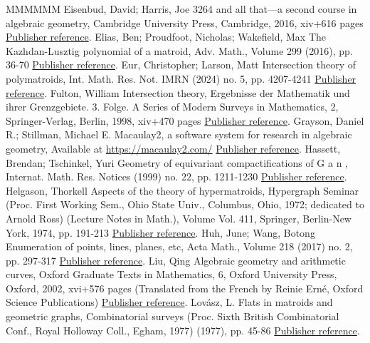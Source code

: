\documentclass[11pt]{article}
\theoremstyle{definition}
\numberwithin{equation}{section}
\begin{document}
\begin{thebibliography}{MMMMMM}
 Eisenbud, David; Harris, Joe 3264 and all that—a second course in algebraic geometry, Cambridge University Press, Cambridge, 2016, xiv+616 pages \href{https://alco.centre-mersenne.org/articles/10.5802/alco.447/#EH16}{Publisher reference}.
 Elias, Ben; Proudfoot, Nicholas; Wakefield, Max The Kazhdan-Lusztig polynomial of a matroid, Adv. Math., Volume 299 (2016), pp. 36-70 \href{https://alco.centre-mersenne.org/articles/10.5802/alco.447/#KLpoly}{Publisher reference}.
 Eur, Christopher; Larson, Matt Intersection theory of polymatroids, Int. Math. Res. Not. IMRN (2024) no. 5, pp. 4207-4241 \href{https://alco.centre-mersenne.org/articles/10.5802/alco.447/#EL23}{Publisher reference}.
 Fulton, William Intersection theory, Ergebnisse der Mathematik und ihrer Grenzgebiete. 3. Folge. A Series of Modern Surveys in Mathematics, 2, Springer-Verlag, Berlin, 1998, xiv+470 pages \href{https://alco.centre-mersenne.org/articles/10.5802/alco.447/#F98}{Publisher reference}.
 Grayson, Daniel R.; Stillman, Michael E. Macaulay2, a software system for research in algebraic geometry, Available at \url{https://macaulay2.com/} \href{https://alco.centre-mersenne.org/articles/10.5802/alco.447/#M2}{Publisher reference}.
 Hassett, Brendan; Tschinkel, Yuri Geometry of equivariant compactifications of G a n , Internat. Math. Res. Notices (1999) no. 22, pp. 1211-1230 \href{https://alco.centre-mersenne.org/articles/10.5802/alco.447/#HT99}{Publisher reference}.
 Helgason, Thorkell Aspects of the theory of hypermatroids, Hypergraph Seminar (Proc. First Working Sem., Ohio State Univ., Columbus, Ohio, 1972; dedicated to Arnold Ross) (Lecture Notes in Math.), Volume Vol. 411, Springer, Berlin-New York, 1974, pp. 191-213 \href{https://alco.centre-mersenne.org/articles/10.5802/alco.447/#H72}{Publisher reference}.
 Huh, June; Wang, Botong Enumeration of points, lines, planes, etc, Acta Math., Volume 218 (2017) no. 2, pp. 297-317 \href{https://alco.centre-mersenne.org/articles/10.5802/alco.447/#HW17}{Publisher reference}.
 Liu, Qing Algebraic geometry and arithmetic curves, Oxford Graduate Texts in Mathematics, 6, Oxford University Press, Oxford, 2002, xvi+576 pages (Translated from the French by Reinie Erné, Oxford Science Publications) \href{https://alco.centre-mersenne.org/articles/10.5802/alco.447/#liu}{Publisher reference}.
 Lovász, L. Flats in matroids and geometric graphs, Combinatorial surveys (Proc. Sixth British Combinatorial Conf., Royal Holloway Coll., Egham, 1977) (1977), pp. 45-86 \href{https://alco.centre-mersenne.org/articles/10.5802/alco.447/#L77}{Publisher reference}.

\end{thebibliography}
\end{document}
